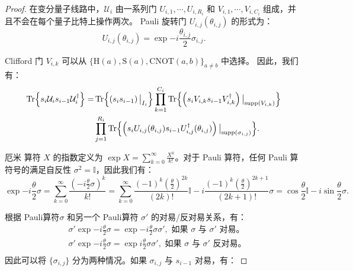 \begin{proof}
    
    在变分量子线路中，$\mathcal{U}_i$ 由一系列门 $U_{i,1},\cdots,U_{i,R_i}$ 和 $V_{i,1},\cdots,V_{i,C_i}$ 组成，并且不会在每个量子比特上操作两次。
    Pauli 旋转门 $U_{i,j}(\theta_{i,j})$ 的形式为：
    \begin{equation}
      U_{i,j}(\theta_{i,j})=\exp{-i \frac{\theta_{i,j}}{2} \sigma_{i,j}}.
    \end{equation}
    
    Clifford 门 $V_{i,k}$ 可以从 $\{\mathrm{H}(a),\mathrm{S}(a),\mathrm{CNOT}(a,b) \}_ {a\neq b}$ 中选择。
    因此，我们有：
    \begin{equation}
      \begin{aligned}
        \Tr{s_i\mathcal{U}_i s_{i-1}\mathcal{U}_i^\dagger}=&\Tr{\left(s_i s_{i-1}\right)\big|_{I_i}}
        \prod_{k=1}^{C_i}\Tr{\left(s_iV_{i,k} s_{i-1}V_{i,k}^{\dagger}\right)\big|_{\text{supp} \left( V_{i,k} \right)}}\\
        &\prod_{j=1}^{R_i}\Tr{\left(s_i U_{i,j}(\theta_{i,j}) s_{i-1} U_{i,j}^\dagger(\theta_{i,j})\right) \big|_{\text{supp} \left( \sigma_{i,j} \right)}}.
      \end{aligned}
    \end{equation}
    
    厄米 算符 $X$ 的指数定义为 $\exp{X}=\sum_{k=0}^\infty\frac{X^k}{k!}$。对于 Pauli 算符，任何 Pauli 算符号的满足自反性 $\sigma^2=\mathbb{I}$，因此我们有：
    \begin{equation}
      \exp{-i \frac{\theta}{2} \sigma}=\sum_{k=0}^\infty\frac{(-i \frac{\theta}{2}\sigma)^k}{k!}=\sum_{k=0}^\infty\frac{(-1)^k (\frac{\theta}{2})^{2k}}{(2k)!} \mathbb{I}- i\frac{(-1)^k (\frac{\theta}{2})^{2k+1}}{(2k+1)!}\sigma=\cos{\frac{\theta}{2}}\mathbb{I}-i \sin{\frac{\theta}{2}}\sigma.
    \end{equation}
    
    根据 Pauli算符$\sigma$ 和另一个 Pauli算符 $\sigma'$ 的对易/反对易关系，有：
    \begin{equation}
    \begin{aligned}
    &\sigma'\exp{-i \frac{\theta}{2} \sigma}=\exp{-i \frac{\theta}{2} \sigma}\sigma',\text{ 如果 }\sigma\text{ 与 }\sigma'\text{ 对易。}\\
    &\sigma'\exp{-i \frac{\theta}{2} \sigma}=\exp{i \frac{\theta}{2} \sigma}\sigma',\text{ 如果 }\sigma\text{ 与 }\sigma'\text{ 反对易。}\\
    \end{aligned}
    \end{equation}
    因此可以将 $\{\sigma_{i,j}\}$ 分为两种情况。如果 $\sigma_{i,j}$ 与 $s_{i-1}$ 对易，有：
    

\end{proof}
